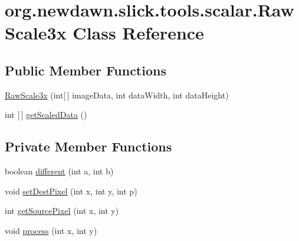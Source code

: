 \hypertarget{classorg_1_1newdawn_1_1slick_1_1tools_1_1scalar_1_1_raw_scale3x}{}\section{org.\+newdawn.\+slick.\+tools.\+scalar.\+Raw\+Scale3x Class Reference}
\label{classorg_1_1newdawn_1_1slick_1_1tools_1_1scalar_1_1_raw_scale3x}
\subsection*{Public Member Functions}
\begin{DoxyCompactItemize}
\item 
\mbox{\hyperlink{classorg_1_1newdawn_1_1slick_1_1tools_1_1scalar_1_1_raw_scale3x_a4b34c8f0de69852f5f7bca5e398e5cf9}{Raw\+Scale3x}} (int\mbox{[}$\,$\mbox{]} image\+Data, int data\+Width, int data\+Height)
\item 
int \mbox{[}$\,$\mbox{]} \mbox{\hyperlink{classorg_1_1newdawn_1_1slick_1_1tools_1_1scalar_1_1_raw_scale3x_ac70ed8797808739faa9b6376e7672c00}{get\+Scaled\+Data}} ()
\end{DoxyCompactItemize}
\subsection*{Private Member Functions}
\begin{DoxyCompactItemize}
\item 
boolean \mbox{\hyperlink{classorg_1_1newdawn_1_1slick_1_1tools_1_1scalar_1_1_raw_scale3x_ab50d19c762329489eae638dafb119a64}{different}} (int a, int b)
\item 
void \mbox{\hyperlink{classorg_1_1newdawn_1_1slick_1_1tools_1_1scalar_1_1_raw_scale3x_a7ae43dc14708a76b767c92304a3fc9c2}{set\+Dest\+Pixel}} (int x, int y, int p)
\item 
int \mbox{\hyperlink{classorg_1_1newdawn_1_1slick_1_1tools_1_1scalar_1_1_raw_scale3x_ad4e113b12cee39ede023b4ce76a7e9f7}{get\+Source\+Pixel}} (int x, int y)
\item 
void \mbox{\hyperlink{classorg_1_1newdawn_1_1slick_1_1tools_1_1scalar_1_1_raw_scale3x_ad2246ebbbbf59dcc24453071bb99edfa}{process}} (int x, int y)
\end{DoxyCompactItemize}
